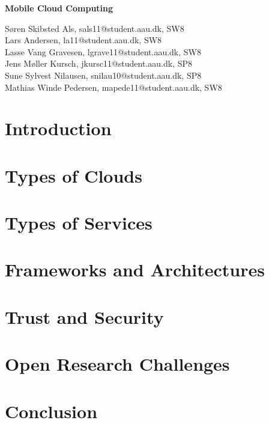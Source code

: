 \documentclass[12pt,a4paper]{article}
\begin{document}
\begin{center}
\bigskip\bigskip
{\Large\bf Mobile Cloud Computing\\}
\bigskip\bigskip


Søren Skibsted Als, sals11@student.aau.dk, SW8\\
Lars Andersen, la11@student.aau.dk, SW8\\
Lasse Vang Gravesen, lgrave11@student.aau.dk, SW8\\
Jens Møller Kursch, jkursc11@student.aau.dk, SP8\\
Sune Sylvest Nilausen, snilau10@student.aau.dk, SP8\\
Mathias Winde Pedersen, mapede11@student.aau.dk, SW8


\bigskip
\begin{abstract}

\end{abstract}

\thispagestyle{empty}
\end{center}


\titlepage

\thispagestyle{plain}


\section{Introduction}


\section{Types of Clouds}

\section{Types of Services}

\section{Frameworks and Architectures}

\section{Trust and Security}

\section{Open Research Challenges}

\section{Conclusion}

\newpage


\label{bib:mybiblio}
\end{document}
